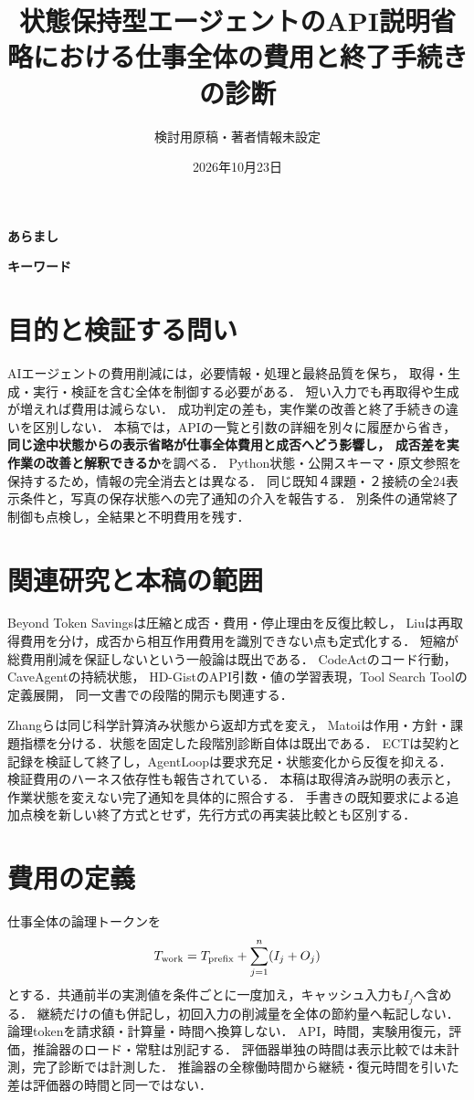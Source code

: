 \documentclass[uplatex,a4paper,twocolumn,10pt]{jsarticle}
\title{状態保持型エージェントのAPI説明省略における\newline 仕事全体の費用と終了手続きの診断}
\author{検討用原稿・著者情報未設定}
\date{2026年10月23日}
\begin{document}
\raggedbottom
\maketitle
\noindent\textbf{あらまし}\quad


\noindent\textbf{キーワード}\quad\LetterJapaneseKeywords

\section{目的と検証する問い}
AIエージェントの費用削減には，必要情報・処理と最終品質を保ち，
取得・生成・実行・検証を含む全体を制御する必要がある．
短い入力でも再取得や生成が増えれば費用は減らない\cite{beyond,interaction}．
成功判定の差も，実作業の改善と終了手続きの違いを区別しない．
本稿では，APIの一覧と引数の詳細を別々に履歴から省き，
\textbf{同じ途中状態からの表示省略が仕事全体費用と成否へどう影響し，
成否差を実作業の改善と解釈できるか}を調べる．
Python状態・公開スキーマ・原文参照を保持するため，情報の完全消去とは異なる．
同じ既知４課題・２接続の全24表示条件と，写真の保存状態への完了通知の介入を報告する．
別条件の通常終了制御も点検し，全結果と不明費用を残す．

\section{関連研究と本稿の範囲}
Beyond Token Savings\cite{beyond}は圧縮と成否・費用・停止理由を反復比較し，
Liu\cite{interaction}は再取得費用を分け，成否から相互作用費用を識別できない点も定式化する．
短縮が総費用削減を保証しないという一般論は既出である．
CodeAct\cite{codeact}のコード行動，CaveAgent\cite{cave}の持続状態，
HD-Gist\cite{hdgist}のAPI引数・値の学習表現，Tool Search Tool\cite{toolsearch}の定義展開，
同一文書での段階的開示\cite{disclosure}も関連する．

Zhangら\cite{evidence}は同じ科学計算済み状態から返却方式を変え，
Matoi\cite{matoi}は作用・方針・課題指標を分ける．状態を固定した段階別診断自体は既出である．
ECT\cite{ect}は契約と記録を検証して終了し，AgentLoop\cite{agentloop}は要求充足・状態変化から反復を抑える．
検証費用のハーネス依存性も報告されている\cite{waste}．
本稿は取得済み説明の表示と，作業状態を変えない完了通知を具体的に照合する．
手書きの既知要求による追加点検を新しい終了方式とせず，先行方式の再実装比較とも区別する．

\section{費用の定義}
仕事全体の論理トークンを
\begin{equation}
 T_{\rm work}=T_{\rm prefix}+\sum_{j=1}^{n}(I_j+O_j)
\end{equation}
とする．共通前半の実測値を条件ごとに一度加え，キャッシュ入力も$I_j$へ含める．
継続だけの値も併記し，初回入力の削減量を全体の節約量へ転記しない．
論理tokenを請求額・計算量・時間へ換算しない．
API，時間，実験用復元，評価，推論器のロード・常駐は別記する．
評価器単独の時間は表示比較では未計測，完了診断では計測した．
推論器の全稼働時間から継続・復元時間を引いた差は評価器の時間と同一ではない．
\end{document}
